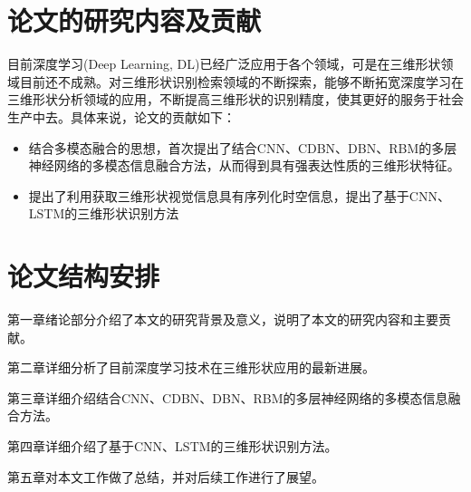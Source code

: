 \section{论文的研究内容及贡献}
目前深度学习(Deep Learning, DL)已经广泛应用于各个领域，可是在三维形状领域目前还不成熟。对三维形状识别检索领域的不断探索，能够不断拓宽深度学习在三维形状分析领域的应用，不断提高三维形状的识别精度，使其更好的服务于社会生产中去。具体来说，论文的贡献如下：

\begin{itemize}
\item 结合多模态融合的思想，首次提出了结合CNN、CDBN、DBN、RBM的多层神经网络的多模态信息融合方法，从而得到具有强表达性质的三维形状特征。
\item 提出了利用获取三维形状视觉信息具有序列化时空信息，提出了基于CNN、LSTM的三维形状识别方法
\end{itemize} 

\section{论文结构安排}

第一章绪论部分介绍了本文的研究背景及意义，说明了本文的研究内容和主要贡献。

第二章详细分析了目前深度学习技术在三维形状应用的最新进展。

第三章详细介绍结合CNN、CDBN、DBN、RBM的多层神经网络的多模态信息融合方法。

第四章详细介绍了基于CNN、LSTM的三维形状识别方法。

第五章对本文工作做了总结，并对后续工作进行了展望。
